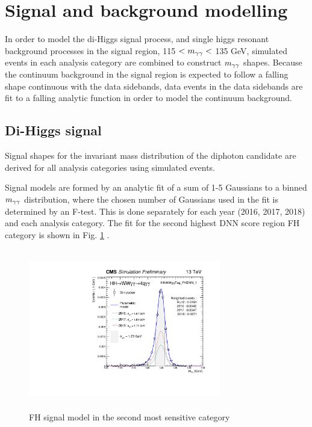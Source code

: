 \section{Signal and background modelling} \label{sec:AnalyticFitting}

In order to model the di-Higgs signal process, and single higgs resonant background processes in the signal region, 115 $< m_{\gamma\gamma} < $ 135 GeV, simulated events 
in each analysis category are combined to construct $m_{\gamma\gamma}$ shapes. Because the continuum background in the signal region is expected to follow a falling 
shape continuous with the data sidebands, data events in the data sidebands are fit to a falling analytic function in order to model the continuum background. 

\subsection{Di-Higgs signal}
\label{sec:SignalFitting}

Signal shapes for the invariant mass distribution of the diphoton candidate are derived for all analysis categories using simulated events. 

Signal models are formed by an analytic fit of a sum of 1-5 Gaussians to a binned $m_{\gamma\gamma}$ distribution, where the chosen number of Gaussians used in the fit is 
determined by an F-test. This is done separately for each year (2016, 2017, 2018) and each analysis category.
The fit for the second highest DNN score region FH category is shown 
in Fig.  \ref{fig:FHSignalModel} . 


\begin{figure}[!htbp]
  \centering
  \includegraphics[width=0.75\textwidth,height=7cm]{Images/AnalyticFitting/Signal/smodel_HHWWggTag_FHDNN_1.pdf}
  \caption{FH signal model in the second most sensitive category}
\label{fig:FHSignalModel}
\end{figure}

